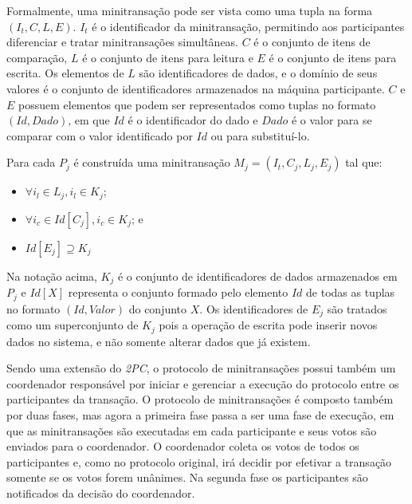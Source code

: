 \documentclass[11pt,twoside,a4paper]{book}
\begin{document}
Formalmente, uma minitransação pode ser vista como uma tupla na forma $(I_t, C, L, E)$. $I_t$ é o identificador da minitransação, permitindo aos participantes diferenciar e tratar minitransações simultâneas. \(C\) é o conjunto de itens de comparação, \(L\) é o conjunto de itens para leitura e \(E\) é o conjunto de itens para escrita. Os elementos de \(L\) são identificadores de dados, e o domínio de seus valores é o conjunto de identificadores armazenados na máquina participante. \(C\) e \(E\) possuem elementos que podem ser representados como tuplas no formato \((Id, Dado)\), em que \(Id\) é o identificador do dado e \(Dado\) é o valor para se comparar com o valor identificado por $Id$ ou para substituí-lo.

Para cada \(P_j\) é construída uma minitransação \(M_j = (I_t, C_j, L_j, E_j)\) tal que:

\begin{itemize}
\item $\forall i_l \in L_j, i_l \in K_j$;
\item $\forall i_c \in Id[C_j], i_c \in K_j$; e
\item $Id[E_j] \supseteq K_j$
\end{itemize}

Na notação acima, $K_j$ é o conjunto de identificadores de dados armazenados em $P_j$ e $Id[X]$ representa o conjunto formado pelo elemento $Id$ de todas as tuplas no formato $(Id, Valor)$ do conjunto $X$. Os identificadores de $E_j$ são tratados como um superconjunto de $K_j$ pois a operação de escrita pode inserir novos dados no sistema, e não somente alterar dados que já existem.

Sendo uma extensão do \emph{2PC}, o protocolo de minitransações possui também um coordenador responsável por iniciar e gerenciar a execução do protocolo entre os participantes da transação. O protocolo de minitransações é composto também por duas fases, mas agora a primeira fase passa a ser uma fase de execução, em que as minitransações são executadas em cada participante e seus votos são enviados para o coordenador. O coordenador coleta os votos de todos os participantes e, como no protocolo original, irá decidir por efetivar a transação somente se os votos forem unânimes. Na segunda fase os participantes são notificados da decisão do coordenador. 

\end{document}
